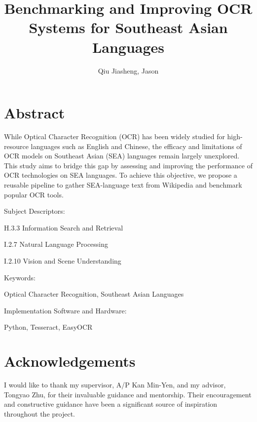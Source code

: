 \documentclass[12pt,oneside]{memoir}
\title{Benchmarking and Improving OCR Systems for Southeast Asian Languages}
\author{Qiu Jiasheng, Jason}
\begin{document}
\frontmatter

\pagestyle{plain}

\makecover

\setcounter{page}{1}

\maketitle
{}

\chapter*{\centering\large Abstract}

While Optical Character Recognition (OCR) has been widely studied for high-resource languages such as English and Chinese, the efficacy and limitations of OCR models on Southeast Asian (SEA) languages remain largely unexplored.
This study aims to bridge this gap by assessing and improving the performance of OCR technologies on SEA languages.
To achieve this objective, we propose a reusable pipeline to gather SEA-language text from Wikipedia and benchmark popular OCR tools.

\vspace{20pt}
Subject Descriptors:

\hspace*{0.3in} H.3.3 Information Search and Retrieval

\hspace*{0.3in} I.2.7 Natural Language Processing

\hspace*{0.3in} I.2.10 Vision and Scene Understanding

Keywords:

\hspace*{0.3in} Optical Character Recognition, Southeast Asian Languages

Implementation Software and Hardware:

\hspace*{0.3in} Python, Tesseract, EasyOCR

\chapter*{\centering\large Acknowledgements}

I would like to thank my supervisor, A/P Kan Min-Yen, and my advisor, Tongyao Zhu, for their invaluable guidance and mentorship. Their encouragement and constructive guidance have been a significant source of inspiration throughout the project.
\end{document}
